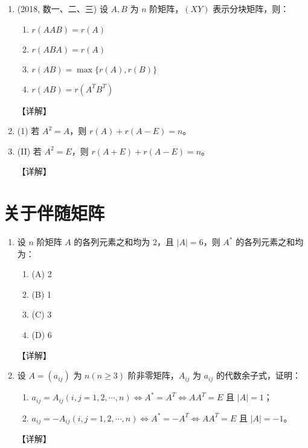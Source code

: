 \documentclass[12pt, a4paper, oneside, UTF8]{ctexbook}
\begin{document}
\begin{enumerate}[label=\arabic*.,start=6]
    \item (2018, 数一、二、三) 设 $ A, B $ 为 $ n $ 阶矩阵，$ (XY) $ 表示分块矩阵，则：
    \begin{enumerate}
        \item $ r(A A B) = r(A) $
        \item $ r(A B A) = r(A) $
        \item $ r(A B) = \max\{r(A), r(B)\} $
        \item $ r(A B) = r(A^T B^T) $
    \end{enumerate}
    
    \begin{solution}
    【详解】
    \end{solution}
    
    \item (1) 若 $ A^2 = A $，则 $ r(A) + r(A - E) = n $。
    \item (II) 若 $ A^2 = E $，则 $ r(A + E) + r(A - E) = n $。
    
    \begin{solution}
    【详解】
    \end{solution}
\end{enumerate}

\section{关于伴随矩阵}

\begin{enumerate}[label=\arabic*.,start=8]
    \item 设 $ n $ 阶矩阵 $ A $ 的各列元素之和均为 2，且 $ |A| = 6 $，则 $ A^* $ 的各列元素之和均为：
    \begin{enumerate}
        \item (A) 2
        \item (B) 1
        \item (C) 3
        \item (D) 6
    \end{enumerate}
    
    \begin{solution}
    【详解】
    \end{solution}
    
    \item 设 $ A = (a_{ij}) $ 为 $ n(n \geq 3) $ 阶非零矩阵，$ A_{ij} $ 为 $ a_{ij} $ 的代数余子式，证明：
    \begin{enumerate}
        \item $ a_{ij} = A_{ij}(i, j = 1, 2, \cdots, n) \Leftrightarrow A^* = A^T \Leftrightarrow AA^T = E $ 且 $ |A| = 1 $；
        \item $ a_{ij} = -A_{ij}(i, j = 1, 2, \cdots, n) \Leftrightarrow A^* = -A^T \Leftrightarrow AA^T = E $ 且 $ |A| = -1 $。
    \end{enumerate}
    
    \begin{solution}
    【详解】
    \end{solution}
\end{enumerate}
\end{document}
